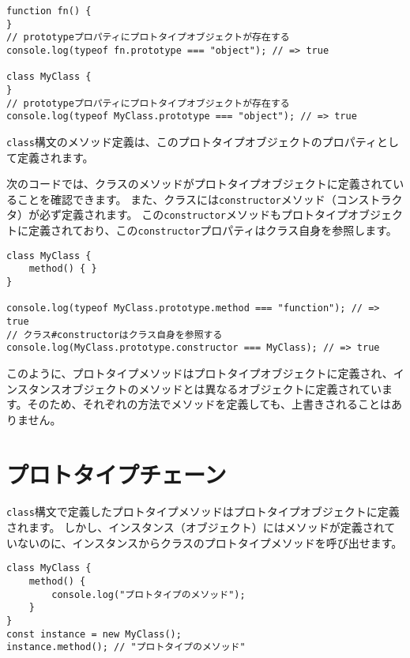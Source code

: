 \begin{lstlisting}
function fn() {
}
// prototypeプロパティにプロトタイプオブジェクトが存在する
console.log(typeof fn.prototype === "object"); // => true

class MyClass {
}
// prototypeプロパティにプロトタイプオブジェクトが存在する
console.log(typeof MyClass.prototype === "object"); // => true
\end{lstlisting}

\texttt{class}構文のメソッド定義は、このプロトタイプオブジェクトのプロパティとして定義されます。

次のコードでは、クラスのメソッドがプロトタイプオブジェクトに定義されていることを確認できます。
また、クラスには\texttt{constructor}メソッド（コンストラクタ）が必ず定義されます。
この\texttt{constructor}メソッドもプロトタイプオブジェクトに定義されており、この\texttt{constructor}プロパティはクラス自身を参照します。

\begin{lstlisting}
class MyClass {
    method() { }
}

console.log(typeof MyClass.prototype.method === "function"); // => true
// クラス#constructorはクラス自身を参照する
console.log(MyClass.prototype.constructor === MyClass); // => true
\end{lstlisting}

このように、プロトタイプメソッドはプロトタイプオブジェクトに定義され、インスタンスオブジェクトのメソッドとは異なるオブジェクトに定義されています。そのため、それぞれの方法でメソッドを定義しても、上書きされることはありません。

\hypertarget{prototype-chain}{%
\section{プロトタイプチェーン}\label{prototype-chain}}

\texttt{class}構文で定義したプロトタイプメソッドはプロトタイプオブジェクトに定義されます。
しかし、インスタンス（オブジェクト）にはメソッドが定義されていないのに、インスタンスからクラスのプロトタイプメソッドを呼び出せます。

\begin{lstlisting}
class MyClass {
    method() {
        console.log("プロトタイプのメソッド");
    }
}
const instance = new MyClass();
instance.method(); // "プロトタイプのメソッド"
\end{lstlisting}


